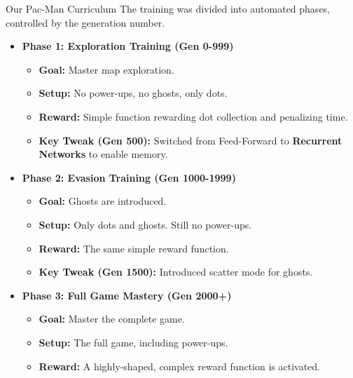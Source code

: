 \begin{frame}{Our Pac-Man Curriculum}
	The training was divided into automated phases, controlled by the generation number.

	\begin{itemize}
		\pause
		\setlength\itemindent{-1em}
		\item<1-> \textbf{Phase 1: Exploration Training (Gen 0-999)}
		\begin{itemize}
			\setlength\itemindent{-1em}
			\item \textbf{Goal:} Master map exploration.
			\item \textbf{Setup:} No power-ups, no ghosts, only dots.
			\item \textbf{Reward:} Simple function rewarding dot collection and penalizing time.
			\item \textbf{Key Tweak (Gen 500):} Switched from Feed-Forward to \textbf{Recurrent Networks} to enable memory.
		\end{itemize}
		\pause

		\vspace{0.5em}

		\item<2-> \textbf{Phase 2: Evasion Training (Gen 1000-1999)}
		\begin{itemize}
			\setlength\itemindent{-1em}
			\item \textbf{Goal:} Ghosts are introduced.
			\item \textbf{Setup:} Only dots and ghosts. Still no power-ups.
			\item \textbf{Reward:} The same simple reward function.
			\item \textbf{Key Tweak (Gen 1500):} Introduced scatter mode for ghosts.
		\end{itemize}
		\pause

		\vspace{0.5em}

		\item<3-> \textbf{Phase 3: Full Game Mastery (Gen 2000+)}
		\begin{itemize}
			\setlength\itemindent{-1em}
			\item \textbf{Goal:} Master the complete game.
			\item \textbf{Setup:} The full game, including power-ups.
			\item \textbf{Reward:} A highly-shaped, complex reward function is activated.
		\end{itemize}
	\end{itemize}
\end{frame}

